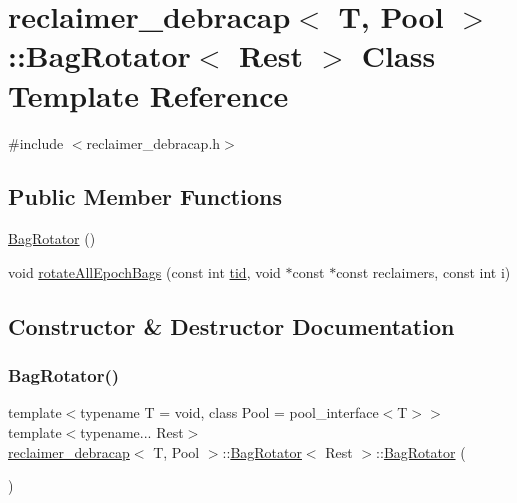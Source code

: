 \hypertarget{classreclaimer__debracap_1_1BagRotator}{}\section{reclaimer\+\_\+debracap$<$ T, Pool $>$\+:\+:Bag\+Rotator$<$ Rest $>$ Class Template Reference}
\label{classreclaimer__debracap_1_1BagRotator}


{\ttfamily \#include $<$reclaimer\+\_\+debracap.\+h$>$}

\subsection*{Public Member Functions}
\begin{DoxyCompactItemize}
\item 
\hyperlink{classreclaimer__debracap_1_1BagRotator_af032cc261507d24ea2c69ed77f56627b}{Bag\+Rotator} ()
\item 
void \hyperlink{classreclaimer__debracap_1_1BagRotator_a2755f52fdc6120af1af61ac4577df2ee}{rotate\+All\+Epoch\+Bags} (const int \hyperlink{microbench_2main_8cpp_a9ca9869868fe7e7a38a921cc7de4103f}{tid}, void $\ast$const $\ast$const reclaimers, const int i)
\end{DoxyCompactItemize}


\subsection{Constructor \& Destructor Documentation}
\mbox{\label{classreclaimer__debracap_1_1BagRotator_af032cc261507d24ea2c69ed77f56627b}} 
\subsubsection{\texorpdfstring{Bag\+Rotator()}{BagRotator()}}
{\footnotesize\ttfamily template$<$typename T  = void, class Pool  = pool\+\_\+interface$<$\+T$>$$>$ \\
template$<$typename... Rest$>$ \\
\hyperlink{classreclaimer__debracap}{reclaimer\+\_\+debracap}$<$ T, Pool $>$\+::\hyperlink{classreclaimer__debracap_1_1BagRotator}{Bag\+Rotator}$<$ Rest $>$\+::\hyperlink{classreclaimer__debracap_1_1BagRotator}{Bag\+Rotator} (\begin{DoxyParamCaption}{ }\end{DoxyParamCaption})\hspace{0.3cm}{\ttfamily [inline]}}




